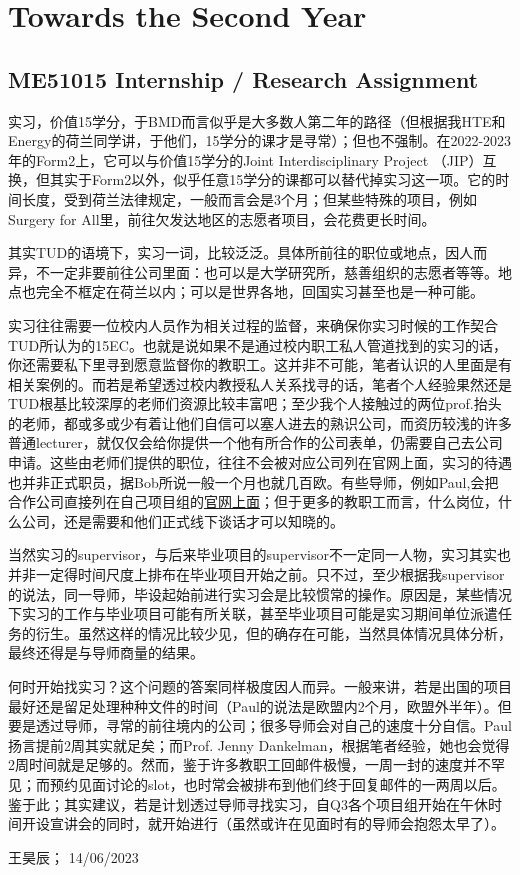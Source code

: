 \vspace{\betsubsec} %
\section{Towards the Second Year}
\subsection{ME51015 Internship / Research Assignment}
实习，价值15学分，于BMD而言似乎是大多数人第二年的路径（但根据我HTE和Energy的荷兰同学讲，于他们，15学分的课才是寻常）；但也不强制。在2022-2023年的Form2上，它可以与价值15学分的Joint Interdisciplinary Project （JIP）互换，但其实于Form2以外，似乎任意15学分的课都可以替代掉实习这一项。它的时间长度，受到荷兰法律规定，一般而言会是3个月；但某些特殊的项目，例如Surgery for All里，前往欠发达地区的志愿者项目，会花费更长时间。

其实TUD的语境下，实习一词，比较泛泛。具体所前往的职位或地点，因人而异，不一定非要前往公司里面：也可以是大学研究所，慈善组织的志愿者等等。地点也完全不框定在荷兰以内；可以是世界各地，回国实习甚至也是一种可能。

实习往往需要一位校内人员作为相关过程的监督，来确保你实习时候的工作契合TUD所认为的15EC。也就是说如果不是通过校内职工私人管道找到的实习的话，你还需要私下里寻到愿意监督你的教职工。这并非不可能，笔者认识的人里面是有相关案例的。而若是希望透过校内教授私人关系找寻的话，笔者个人经验果然还是TUD根基比较深厚的老师们资源比较丰富吧；至少我个人接触过的两位prof.抬头的老师，都或多或少有着让他们自信可以塞人进去的熟识公司，而资历较浅的许多普通lecturer，就仅仅会给你提供一个他有所合作的公司表单，仍需要自己去公司申请。这些由老师们提供的职位，往往不会被对应公司列在官网上面，实习的待遇也并非正式职员，据Bob所说一般一个月也就几百欧。有些导师，例如Paul,会把合作公司直接列在自己项目组的\href{https://www.bitegroup.nl/internships/}{\uline{官网上面}}；但于更多的教职工而言，什么岗位，什么公司，还是需要和他们正式线下谈话才可以知晓的。

当然实习的supervisor，与后来毕业项目的supervisor不一定同一人物，实习其实也并非一定得时间尺度上排布在毕业项目开始之前。只不过，至少根据我supervisor的说法，同一导师，毕设起始前进行实习会是比较惯常的操作。原因是，某些情况下实习的工作与毕业项目可能有所关联，甚至毕业项目可能是实习期间单位派遣任务的衍生。虽然这样的情况比较少见，但的确存在可能，当然具体情况具体分析，最终还得是与导师商量的结果。

何时开始找实习？这个问题的答案同样极度因人而异。一般来讲，若是出国的项目最好还是留足处理种种文件的时间（Paul的说法是欧盟内2个月，欧盟外半年）。但要是透过导师，寻常的前往境内的公司；很多导师会对自己的速度十分自信。Paul扬言提前2周其实就足矣；而Prof. Jenny Dankelman，根据笔者经验，她也会觉得2周时间就是足够的。然而，鉴于许多教职工回邮件极慢，一周一封的速度并不罕见；而预约见面讨论的slot，也时常会被排布到他们终于回复邮件的一两周以后。鉴于此；其实建议，若是计划透过导师寻找实习，自Q3各个项目组开始在午休时间开设宣讲会的同时，就开始进行（虽然或许在见面时有的导师会抱怨太早了）。
\begin{flushright}
王昊辰； 14/06/2023
\end{flushright}

